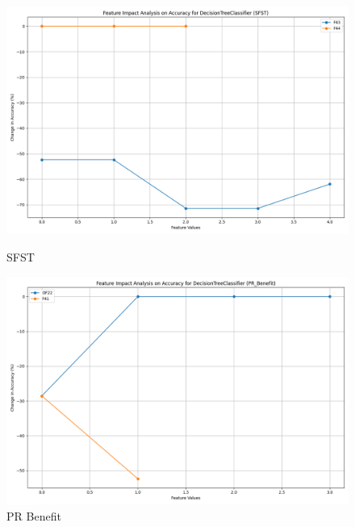 \begin{figure}[H]
    \centering
    \begin{minipage}{0.495\textwidth}
        \centering
        \includegraphics[width=\linewidth]{analysis/images/feature_impact_accuracy_SFST_DecisionTreeClassifier.png}
        \caption{SFST}
        \label{fig:sfst_accuracy_analysis}
    \end{minipage}\hfill
    \begin{minipage}{0.495\textwidth}
        \centering
        \includegraphics[width=\linewidth]{analysis/images/feature_impact_accuracy_PR_Benefit_DecisionTreeClassifier.png}
        \caption{PR Benefit}
        \label{fig:pr_ben_accuracy_analysis}
    \end{minipage}
\end{figure}

